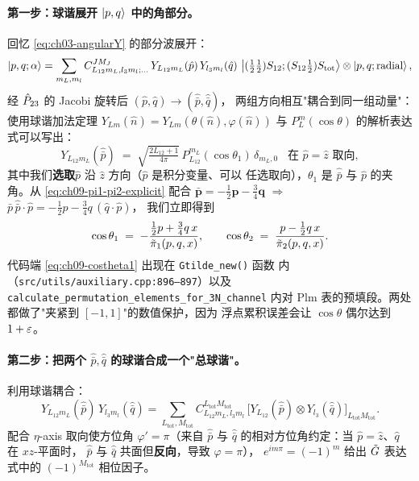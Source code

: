 \paragraph{第一步：球谐展开 \(\ket{p,q}\) 中的角部分。}
回忆 \cref{eq:ch03-angularY} 的部分波展开：
\begin{equation}
\ket{p,q;\alpha}
=
\sum_{m_{L},m_{l}}
C^{J M_J}_{L_{12} m_L, l_3 m_l;\dots}
\,Y_{L_{12} m_L}(\hat{p})\,Y_{l_3 m_l}(\hat{q})\,
\ket{(\tfrac{1}{2}\tfrac{1}{2})S_{12};(S_{12}\tfrac{1}{2})S_{\text{tot}}}
\otimes\ket{p,q;\text{radial}},
\end{equation}
经 \(\hat{P}_{23}\) 的 Jacobi 旋转后 \((\hat{p},\hat{q})\to(\hat{\bar p},\hat{\bar q})\)，
两组方向相互"耦合到同一组动量"：使用球谐加法定理
\(Y_{Lm}(\hat{n})=Y_{Lm}(\theta(\hat{n}),\varphi(\hat{n}))\) 与
\(P^{m}_{L}(\cos\theta)\) 的解析表达式可以写出：
\begin{equation}
Y_{L_{12} m_L}(\hat{\bar p})\;=\;\sqrt{\tfrac{2L_{12}+1}{4\pi}}\,P^{m_L}_{L_{12}}(\cos\theta_1)\,
\delta_{m_L,0}\;\;\;\text{在 }\hat{p}=\hat{z}\text{ 取向},
\end{equation}
其中我们\textbf{选取}\(\hat{p}\) 沿 \(\hat{z}\) 方向（\(\hat{p}\) 是积分变量、可以
任选取向），\(\theta_1\) 是 \(\hat{\bar p}\) 与 \(\hat{p}\) 的夹角。从
\eqref{eq:ch09-pi1-pi2-explicit} 配合 \(\bar{\boldsymbol{p}}=-\tfrac{1}{2}\boldsymbol{p}-\tfrac{3}{4}\boldsymbol{q}\)
\(\Rightarrow\) \(\bar{p}\,\hat{\bar p}\!\cdot\!\hat{p}=-\tfrac{1}{2}p-\tfrac{3}{4}q\,(\hat{q}\!\cdot\!\hat{p})\)，
我们立即得到
\begin{equation}
\label{eq:ch09-costheta1}
\cos\theta_1 \;=\; -\frac{\tfrac{1}{2}p + \tfrac{3}{4}q\,x}{\tilde{\pi}_{1}(p,q,x)},
\qquad
\cos\theta_2 \;=\; \frac{p - \tfrac{1}{2}q\,x}{\tilde{\pi}_{2}(p,q,x)}.
\end{equation}
代码端 \eqref{eq:ch09-costheta1} 出现在 \texttt{Gtilde\_new()} 函数
内（\texttt{src/utils/auxiliary.cpp:896--897}）以及 \texttt{calculate\_permutation\_elements\_for\_3N\_channel}
内对 Plm 表的预填段。两处都做了"夹紧到 \([-1,1]\)"的数值保护，因为
浮点累积误差会让 \(\cos\theta\) 偶尔达到 \(1+\varepsilon\)。

\paragraph{第二步：把两个 \(\hat{\bar p}, \hat{\bar q}\) 的球谐合成一个"总球谐"。}
利用球谐耦合：
\begin{equation}
Y_{L_{12} m_L}(\hat{\bar p})\,Y_{l_3 m_l}(\hat{\bar q})
=
\sum_{L_{\text{tot}},M_{\text{tot}}}\!
C^{L_{\text{tot}} M_{\text{tot}}}_{L_{12} m_L, l_3 m_l}\,
\bigl[Y_{L_{12}}(\hat{\bar p})\otimes Y_{l_3}(\hat{\bar q})\bigr]_{L_{\text{tot}}M_{\text{tot}}}.
\end{equation}
配合 \(\eta\)-axis 取向使方位角 \(\varphi'=\pi\)（来自 \(\hat{\bar p}\) 与
\(\hat{\bar q}\) 的相对方位角约定：当 \(\hat{p}=\hat{z}\)、\(\hat{q}\) 在 \(xz\)-平面时，
\(\hat{\bar p}\) 与 \(\hat{\bar q}\) 共面但\textbf{反向}，导致 \(\varphi=\pi\)），
\(e^{i m\pi}=(-1)^m\) 给出 \(\tilde{G}\) 表达式中的 \((-1)^{M_{\text{tot}}}\)
相位因子。


